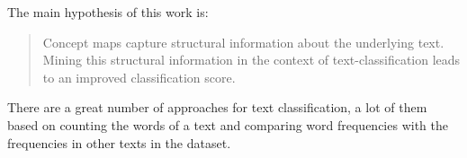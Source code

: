 The main hypothesis of this work is:
\begin{quote}
Concept maps capture structural information about the underlying text. Mining this structural information in the context of text-classification leads to an improved classification score.
\end{quote}

There are a great number of approaches for text classification, a lot of them based on counting the words of a text and comparing word frequencies with the frequencies in other texts in the dataset.


